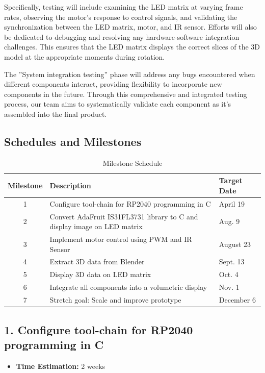 \documentclass[11pt,journal]{IEEEtran}
\begin{document}
Specifically, testing will include examining the LED matrix at varying frame rates, observing the motor's response to control signals, and validating the synchronization between the LED matrix, motor, and IR sensor. Efforts will also be dedicated to debugging and resolving any hardware-software integration challenges. This ensures that the LED matrix displays the correct slices of the 3D model at the appropriate moments during rotation.

The ''System integration testing'' phase will address any bugs encountered when different components interact, providing flexibility to incorporate new components in the future. Through this comprehensive and integrated testing process, our team aims to systematically validate each component as it's assembled into the final product.


\subsection{Schedules and Milestones}


\begin{table}[h]
\centering
\caption{Milestone Schedule}
\begin{tabular}{|c|p{3cm}|p{3cm}|}
\hline
\textbf{Milestone} & \textbf{Description} & \textbf{Target Date} \\
\hline
1 & Configure tool-chain for RP2040 programming in C & April 19 \\
\hline
2 & Convert AdaFruit IS31FL3731 library to C and display image on LED matrix & Aug. 9 \\
\hline
3 & Implement motor control using PWM and IR Sensor & August 23 \\
\hline
4 & Extract 3D data from Blender & Sept. 13 \\
\hline
5 & Display 3D data on LED matrix & Oct. 4 \\
\hline
6 & Integrate all components into a volumetric display & Nov. 1 \\
\hline
7 & Stretch goal: Scale and improve prototype & December 6 \\
\hline
\end{tabular}
\end{table}

\subsection*{1. Configure tool-chain for RP2040 programming in C}
\begin{itemize}
  \item \textbf{Time Estimation:} 2 weeks
\end{itemize}
\end{document}
